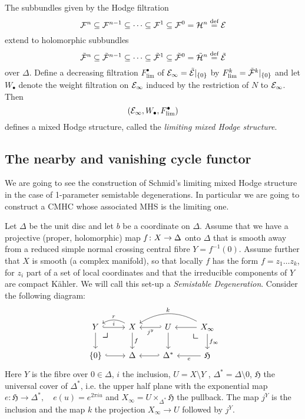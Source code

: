 \documentclass[../main.tex]{subfiles}
\begin{document}
\begin{theorem} \textup{\cite[Thm. 6.16]{Sc73}} \label{limmhsthm}
The subbundles given by the Hodge filtration
\[\mathcal{F}^n\subseteq\mathcal{F}^{n-1}\subseteq\cdots\subseteq\mathcal{F}^1\subseteq\mathcal{F}^0=\mathcal{H}^n \stackrel{\text{def}}{=} \mathcal{E}\]
extend to holomorphic subbundles
\[\tilde{\mathcal{F}}^n\subseteq\tilde{\mathcal{F}}^{n-1}\subseteq\cdots\subseteq\tilde{\mathcal{F}}^1\subseteq\tilde{\mathcal{F}}^0= \tilde{\mathcal{H}}^n \stackrel{\text{def}}{=} \tilde{\mathcal{E}}\]
over $\Delta$. Define a decreasing filtration  $F^{\bullet}_{\operatorname{lim}}$ of $\mathcal{E}_\infty=\tilde{\mathcal{E}}|_{\{0\}}$ by $F^k_{\operatorname{lim}}=\tilde{\mathcal{F}}^k|_{\{0\}}$ and let $W_{\bullet}$ denote the weight filtration on $\mathcal{E}_\infty$ induced by the restriction of $N$ to $\mathcal{E}_\infty$. Then
\[(\mathcal{E}_\infty,W_\bullet,F^\bullet_{\operatorname{lim}})\]
defines a mixed Hodge structure, called the \emph{limiting mixed Hodge structure}.
\end{theorem}



\subsection{The nearby and vanishing cycle functor}

We are going to see the construction of Schmid's limiting mixed Hodge structure in the case of 1-parameter semistable degenerations. In particular we are going to construct a CMHC whose associated MHS is the limiting one. 

Let $\Delta$ be the unit disc and let $b$ be a coordinate on $\Delta$. Assume that we have a projective (proper, holomorphic) map $f\colon X\to \Delta$ onto $\Delta$ that is smooth away from a reduced simple normal crossing central fibre $Y=f^{-1}(0)$. Assume further that $X$ is smooth (a complex manifold), so that locally $f$ has the form $f=z_1\ldots  z_k$, for $z_i$ part of a set of local coordinates and that the irreducible components of $Y$ are compact K\"ahler.
We will call this set-up a \emph{Semistable Degeneration}.
Consider the following diagram:
\begin{equation} \label{diagramdeg}
\begin{tikzcd} 
 Y \arrow[dr, phantom, "\scalebox{1.5}{$\lrcorner$}" , very near start, color=black] \arrow[hookrightarrow]{r}{i} \arrow[d] & X \arrow[bend right=30,swap]{l}{r} \arrow[d,"f"]  & \ar[l,hook', "j^y"]  U  \arrow[d]   & X_{\infty} \arrow[dl, phantom, "\scalebox{1.5}{$\llcorner$}" , very near start, color=black]  \arrow[l] \arrow[d, "f_{\infty}"] \arrow[bend right=30,swap]{ll}{k} \\
 \{0\}\arrow[hookrightarrow]{r} & \Delta  &  \Delta^*     \ar[l,hook'] &  \mathfrak{H} \arrow[l, "e"]
\end{tikzcd}
\end{equation}
Here $Y$ is the fibre over $0 \in \Delta$, $i$ the inclusion, $U = X \setminus Y$ , $\Delta^* = \Delta \setminus {0}$, $\mathfrak{H}$ the universal cover of $\Delta^*$, i.e. the upper half plane with the exponential map $e \colon \mathfrak{H} \to \Delta^*, \quad e(u)= e^{2 \pi i u} $ and $X_{\infty} = U \times_{\Delta^*} \mathfrak{H}$ the pullback. The map $j^Y$ is the inclusion and the map $k$ the projection $X_{\infty} \to U$ followed by $j^Y$.
\end{document}
